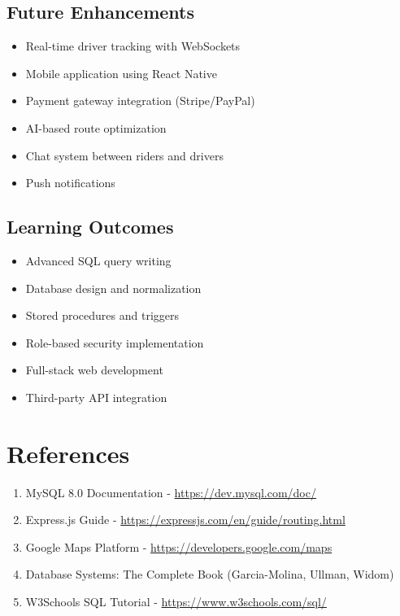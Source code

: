 \documentclass[12pt,a4paper]{report}
\begin{document}
\section{Future Enhancements}
\begin{itemize}
    \item Real-time driver tracking with WebSockets
    \item Mobile application using React Native
    \item Payment gateway integration (Stripe/PayPal)
    \item AI-based route optimization
    \item Chat system between riders and drivers
    \item Push notifications
\end{itemize}

\section{Learning Outcomes}
\begin{itemize}
    \item Advanced SQL query writing
    \item Database design and normalization
    \item Stored procedures and triggers
    \item Role-based security implementation
    \item Full-stack web development
    \item Third-party API integration
\end{itemize}

\chapter*{References}

\begin{enumerate}
    \item MySQL 8.0 Documentation - \url{https://dev.mysql.com/doc/}
    \item Express.js Guide - \url{https://expressjs.com/en/guide/routing.html}
    \item Google Maps Platform - \url{https://developers.google.com/maps}
    \item Database Systems: The Complete Book (Garcia-Molina, Ullman, Widom)
    \item W3Schools SQL Tutorial - \url{https://www.w3schools.com/sql/}
\end{enumerate}
\end{document}
